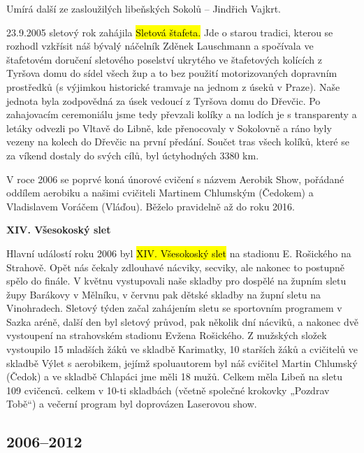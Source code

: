 Umírá další ze zasloužilých libeňských Sokolů -- Jindřich Vajkrt.

23.9.2005 sletový rok zahájila \hl{Sletová štafeta.} Jde o starou
tradici, kterou se rozhodl vzkřísit náš bývalý náčelník Zděnek
Lauschmann a spočívala ve štafetovém doručení sletového poselství
ukrytého ve štafetových kolících z Tyršova domu do sídel všech žup a to
bez použití motorizovaných dopravním prostředků (s výjimkou historické
tramvaje na jednom z úseků v Praze). Naše jednota byla zodpovědná za
úsek vedoucí z Tyršova domu do Dřevčic. Po zahajovacím ceremoniálu jsme
tedy převzali kolíky a na lodích je s transparenty a letáky odvezli po
Vltavě do Libně, kde přenocovaly v Sokolovně a ráno byly vezeny na
kolech do Dřevčic na první předání. Součet tras všech kolíků, které se
za víkend dostaly do svých cílů, byl úctyhodných 3380 km.

V roce 2006 se poprvé koná únorové cvičení s názvem Aerobik Show,
pořádané oddílem aerobiku a našimi cvičiteli Martinem Chlumským
(Čedokem) a Vladislavem Voráčem (Vláďou). Běželo pravidelně až do roku
2016.

\textbf{XIV. Všesokoský slet}

Hlavní událostí roku 2006 byl \hl{XIV. Všesokoský slet} na stadionu E.
Rošického na Strahově. Opět nás čekaly zdlouhavé nácviky, secviky, ale
nakonec to postupně spělo do finále. V květnu vystupovali naše skladby
pro dospělé na župním sletu župy Barákovy v Mělníku, v červnu pak dětské
skladby na župní sletu na Vinohradech. Sletový týden začal zahájením
sletu se sportovním programem v Sazka aréně, další den byl sletový
průvod, pak několik dní nácviků, a nakonec dvě vystoupení na strahovském
stadionu Evžena Rošického. Z mužských složek vystoupilo 15 mladších žáků
ve skladbě Karimatky, 10 starších žáků a cvičitelů ve skladbě Výlet s
aerobikem, jejímž spoluautorem byl náš cvičitel Martin Chlumský (Čedok)
a ve skladbě Chlapáci jme měli 18 mužů. Celkem měla Libeň na sletu 109
cvičenců. celkem v 10-ti skladbách (včetně společné krokovky „Pozdrav
Tobě``) a večerní program byl doprovázen Laserovou show.

\subsection{2006--2012}\label{section-1}

